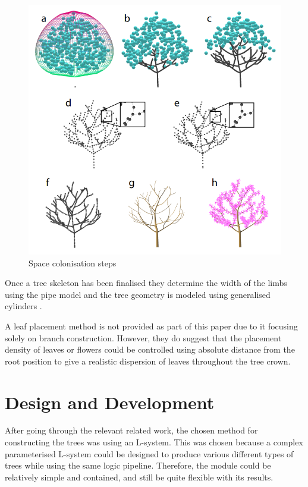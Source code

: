 \documentclass[final]{cmpreport}
\begin{document}
\begin{figure}[ht]
    \includegraphics[scale=0.5]{space-colonisation.PNG} 
    \centering
    \captionsetup{justification=centering}
    \caption{Space colonisation steps}
    \label{fig:space-colonisation}
\end{figure}

Once a tree skeleton has been finalised they determine the width of the limbs using the pipe 
model \citep{shinozaki1964quantitative} and the tree geometry is modeled using generalised 
cylinders \citep{bloomenthal1985modeling}.

A leaf placement method is not provided as part of this paper due to it focusing solely on 
branch construction. However, they do suggest that the placement density of leaves or flowers 
could be controlled using absolute distance from the root position to give a realistic dispersion 
of leaves throughout the tree crown.

\section{Design and Development}
After going through the relevant related work, the chosen method for constructing the trees was 
using an L-system. This was chosen because a complex parameterised L-system could be designed to 
produce various different types of trees while using the same logic pipeline. Therefore, the 
module could be relatively simple and contained, and still be quite flexible with its results.
\end{document}
